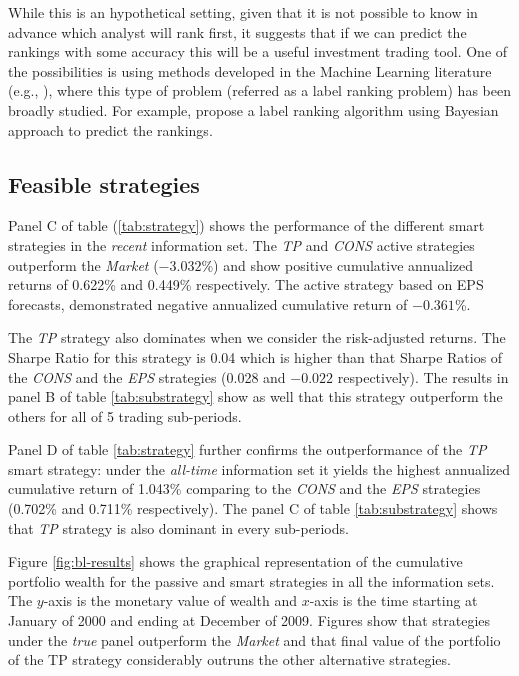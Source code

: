 \documentclass{article}\usepackage[]{graphicx}\usepackage[]{color}
\newcommand{\tr}{\textit{true}}
\newcommand{\naive}{\textit{recent}}
\newcommand{\default}{\textit{all-time}}
\begin{document}
While this is an hypothetical setting, given that it is not possible to know in advance which analyst will rank first, it suggests that if we can predict the rankings with some accuracy this will be a useful investment trading tool. One of the possibilities is using methods developed in the Machine Learning literature (e.g., \cite{aiguzhinov2010,brazdil2003}), where this type of problem (referred as a label ranking problem) has been broadly studied. For example, \cite{aiguzhinov2010} propose a label ranking algorithm using Bayesian approach to predict the rankings.



\subsection{Feasible strategies}
Panel C of table (\ref{tab:strategy}) shows the performance of the different smart strategies in the \naive{} information set. The \textit{TP} and \textit{CONS} active strategies outperform the \textit{Market} (\ensuremath{-3.032}\%)  and show positive cumulative annualized returns of 0.622\% and  0.449\% respectively. The active strategy based on EPS forecasts, demonstrated negative annualized cumulative return of \ensuremath{-0.361}\%. 


The \textit{TP} strategy also dominates when we consider the risk-adjusted returns. The Sharpe Ratio for this strategy is 0.04 which is higher than that Sharpe Ratios of the \textit{CONS} and  the \textit{EPS} strategies  (0.028 and \ensuremath{-0.022} respectively). The results in panel B of table \ref{tab:substrategy} show as well that this strategy outperform the others for all of 5 trading sub-periods. 

Panel D of table \ref{tab:strategy} further confirms the outperformance of the \textit{TP} smart strategy: under the \default{} information set it yields the highest annualized cumulative return  of 1.043\% comparing to the \textit{CONS} and the \textit{EPS} strategies (0.702\% and 0.711\% respectively). The panel C of table \ref{tab:substrategy} shows that \textit{TP} strategy is also dominant in every sub-periods. 



Figure \ref{fig:bl-results} shows the graphical representation of the cumulative portfolio wealth for  the passive and smart strategies in all the information sets. The $y$-axis is the monetary value of wealth and $x$-axis is the time starting at January of 2000 and ending at December of 2009. Figures show that strategies under the \tr{} panel outperform the \emph{Market} and that final value  of the portfolio of the TP strategy considerably outruns the other alternative strategies.
\end{document}
